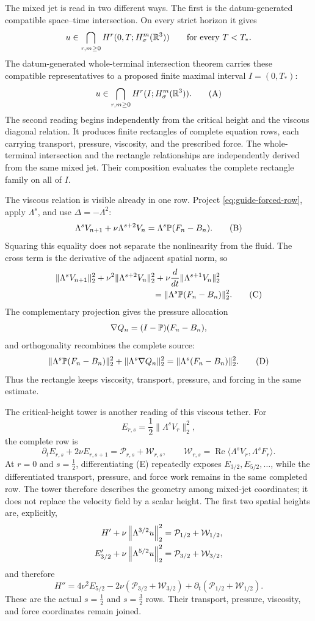 \label{guide:intersection}
The mixed jet is read in two different ways.  The first is the datum-generated
compatible space--time intersection.  On every strict horizon it gives
\[
 u\in\bigcap_{r,m\ge0}H^r(0,T;H^m_\sigma(\mathbb R^3))
 \qquad\text{for every }T<T_*.
\]
The datum-generated whole-terminal intersection theorem carries these
compatible representatives to a proposed finite maximal interval
\(I=(0,T_*)\):
\[
 u\in\bigcap_{r,m\ge0}H^r(I;H^m_\sigma(\mathbb R^3)).
 \tag{A}
\]
The second reading begins independently from the critical height and the
viscous diagonal relation.  It produces finite rectangles of complete
equation rows, each carrying transport, pressure, viscosity, and the
prescribed force.  The whole-terminal intersection and the rectangle
relationships are independently derived from the same mixed jet.  Their
composition evaluates the complete rectangle family on all of \(I\).

The viscous relation is visible already in one row.  Project
\eqref{eq:guide-forced-row}, apply \(\Lambda^s\), and use
\(\Delta=-\Lambda^2\):
\[
 \Lambda^sV_{n+1}+\nu\Lambda^{s+2}V_n
 =\Lambda^s\mathbb P(F_n-B_n).
 \tag{B}
\]
Squaring this equality does not separate the nonlinearity from the fluid.
The cross term is the derivative of the adjacent spatial norm, so
\begin{align}
 &\|\Lambda^sV_{n+1}\|_2^2
 +\nu^2\|\Lambda^{s+2}V_n\|_2^2
 +\nu\frac{d}{dt}\|\Lambda^{s+1}V_n\|_2^2
 \notag\\
 &\hspace{4cm}
 =\|\Lambda^s\Pp(F_n-B_n)\|_2^2.
 \tag{C}
\end{align}
The complementary projection gives the pressure allocation
\[
 \nabla Q_n=(I-\mathbb P)(F_n-B_n),
\]
and orthogonality recombines the complete source:
\[
 \|\Lambda^s\mathbb P(F_n-B_n)\|_2^2
 +\|\Lambda^s\nabla Q_n\|_2^2
 =\|\Lambda^s(F_n-B_n)\|_2^2.
 \tag{D}
\]
Thus the rectangle keeps viscosity, transport, pressure, and forcing in the
same estimate.

The critical-height tower is another reading of this viscous tether.  For
\[
 E_{r,s}=\frac12\|\Lambda^sV_r\|_2^2,
\]
the complete row is
\[
 \partial_tE_{r,s}+2\nu E_{r,s+1}
 =\mathcal P_{r,s}+\mathcal W_{r,s},
 \qquad
 \mathcal W_{r,s}
 =\operatorname{Re}\langle\Lambda^sV_r,\Lambda^sF_r\rangle.
 \tag{E}
\]
At \(r=0\) and \(s=\tfrac12\), differentiating (E) repeatedly exposes
\(E_{3/2},E_{5/2},\ldots\), while the differentiated transport, pressure,
and force work remains in the same completed row.  The tower therefore
describes the geometry among mixed-jet coordinates; it does not replace the
velocity field by a scalar height.
The first two spatial heights are, explicitly,
\begin{align*}
 H'+\nu\left\lVert \Lambda^{3/2}u\right\rVert_2^2
 &=\mathcal P_{1/2}+\mathcal W_{1/2},\\
 E_{3/2}'+\nu\left\lVert \Lambda^{5/2}u\right\rVert_2^2
 &=\mathcal P_{3/2}+\mathcal W_{3/2},
\end{align*}
and therefore
\[
 H''=4\nu^2E_{5/2}
 -2\nu(\mathcal P_{3/2}+\mathcal W_{3/2})
 +\partial_t(\mathcal P_{1/2}+\mathcal W_{1/2}).
\]
These are the actual \(s=\tfrac12\) and \(s=\tfrac32\) rows.  Their
transport, pressure, viscosity, and force coordinates remain joined.

